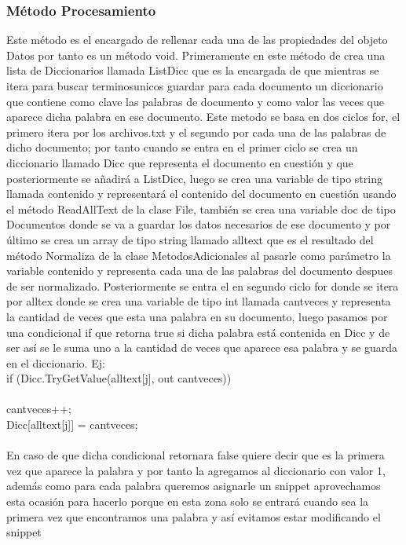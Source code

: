 \documentclass{article}
\begin{document}
\subsubsection{Método Procesamiento}
Este método es el encargado de rellenar cada una de las propiedades del objeto Datos por tanto es un método void.
Primeramente en este método de crea una lista de Diccionarios llamada ListDicc que es la encargada de que mientras se itera 
para buscar terminosunicos guardar para cada documento un diccionario que contiene como clave las palabras de documento y como 
valor las veces que aparece dicha palabra en ese documento. Este metodo se basa en dos ciclos for, el primero itera por los archivos.txt
y el segundo por cada una de las palabras de dicho documento; por tanto cuando se entra en el primer ciclo se crea un diccionario 
llamado Dicc que representa el documento en cuestión y que posteriormente se añadirá a ListDicc, luego se crea una variable de tipo 
string llamada contenido y representará el contenido del documento en cuestión usando el método ReadAllText de la clase File, también
se crea una variable doc de tipo Documentos donde se va a guardar los datos necesarios de ese documento y por último se 
crea un array de tipo string llamado alltext que es el resultado del método Normaliza de la clase MetodosAdicionales
al pasarle como parámetro la variable contenido y representa cada una de las palabras del documento despues de ser normalizado.
 Posteriormente se entra el en segundo ciclo for donde se itera por alltex donde se crea una variable de tipo int llamada cantveces 
 y representa la cantidad de veces que esta una palabra en su documento, luego pasamos por una condicional if que retorna true si 
 dicha palabra está contenida en Dicc y de ser así se le suma uno a la cantidad de veces que aparece esa palabra y se guarda
 en el diccionario. Ej:\\
 if (Dicc.TryGetValue(alltext[j], out cantveces))\\
 {\\
 cantveces++;\\
 Dicc[alltext[j]] = cantveces;\\
 }\\
 En caso de que dicha condicional retornara false quiere decir que es la primera vez que aparece la palabra y por tanto la agregamos al 
 diccionario con valor 1, además como para cada palabra queremos asignarle un snippet aprovechamos esta ocasión para hacerlo porque
 en esta zona solo se entrará cuando sea la primera vez que encontramos una palabra y así evitamos estar modificando el snippet 
\end{document}
